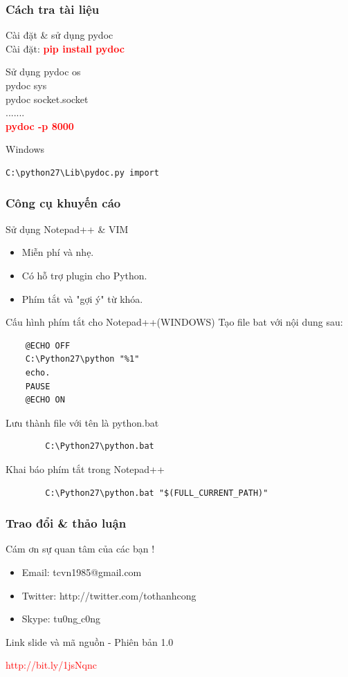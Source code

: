 \documentclass[10pt]{beamer}
\newcommand\sFontvi{\fontsize{8}{7.2}\selectfont} %
\begin{document}
\label{Bonus}
\label{Slide: Cach tra tai lieu}
\begin{frame}[fragile]
\frametitle{Cách tra tài liệu}
Cài đặt \& sử dụng pydoc \\ \pause
Cài đặt: \textcolor{red}{\textbf{pip install pydoc}}\\
\begin{block}{Sử dụng}
pydoc os \\
pydoc sys \\
pydoc socket.socket\\ 
.......\\
\pause
\textcolor{red}{\textbf{pydoc -p 8000}}
\end{block} 
\pause
\begin{block}{Windows} 
\begin{verbatim}
C:\python27\Lib\pydoc.py import
\end{verbatim} 
\end{block}
\end{frame}
\label{Slide: Cong cu khuyen cao Notepad++}
\begin{frame}[fragile]
\frametitle{Công cụ khuyến cáo}
\begin{block}{Sử dụng Notepad++ \& VIM}
\begin{itemize}
\item Miễn phí và nhẹ.
\item Có hỗ trợ plugin cho Python.
\item Phím tắt và "gợi ý" từ khóa.
\end{itemize}
\end{block}
\sFontvi
\begin{block}{Cấu hình phím tắt cho Notepad++(WINDOWS)}
Tạo file bat với nội dung sau:
\begin{verbatim}
	@ECHO OFF
	C:\Python27\python "%1"
	echo.
	PAUSE
	@ECHO ON
\end{verbatim}
Lưu thành file với tên là python.bat
\noindent 
\begin{verbatim}
 		C:\Python27\python.bat
\end{verbatim} 
Khai báo phím tắt trong Notepad++ 
\begin{verbatim}
		C:\Python27\python.bat "$(FULL_CURRENT_PATH)"
\end{verbatim}
\end{block}
\end{frame}
\label{Trao doi & Thao Luan}
\begin{frame}
\frametitle{Trao đổi \& thảo luận}
\Huge{\centerline{Cám ơn sự quan tâm của các bạn !}}
\space
\sFontvi	
	\begin{itemize}
		\item Email: tcvn1985@gmail.com
		\item Twitter: http://twitter.com/tothanhcong
		\item Skype: tu0ng$\_$c0ng
	\end{itemize}
Link slide và mã nguồn - Phiên bản 1.0
\Huge{\centerline{\textcolor{red}{http://bit.ly/1jsNqnc}}}
\end{frame}
\end{document}
